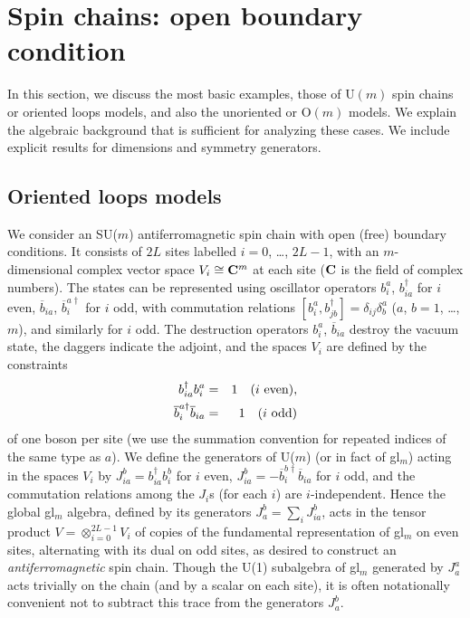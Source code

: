 \documentclass[twocolumn,floats,pra]{revtex4}
\begin{document}

\section{Spin chains: open boundary condition}
\label{chains}

In this section, we discuss the most basic examples, those of
U$(m)$ spin chains or oriented loops models, and also the
unoriented or O$(m)$ models. We explain the algebraic background
that is sufficient for analyzing these cases. We include explicit
results for dimensions and symmetry generators.


\subsection{Oriented loops models}

We consider an SU($m$) antiferromagnetic spin chain with open
(free) boundary conditions. It consists of $2L$ sites labelled
$i=0$, \ldots, $2L-1$, with an $m$-dimensional complex vector
space $V_i\cong {\bf C}^m$ at each site ($\bf C$ is the field of
complex numbers). The states can be represented using oscillator
operators $b_i^a$, $b_{ia}^\dagger$ for $i$ even,
$\overline{b}_{ia}$, $\overline{b}_i^{a\dagger}$ for $i$ odd, with
commutation relations $[b_i^a,b_{jb}^\dagger]=
\delta_{ij}\delta_b^a$ ($a$, $b=1$, \ldots, $m$), and similarly
for $i$ odd. The destruction operators $b_i^a$,
$\overline{b}_{ia}$ destroy the vacuum state, the daggers indicate
the adjoint, and the spaces $V_i$ are defined by the constraints
\begin{eqnarray}
b_{ia}^\dagger b_i^a&=& 1 \quad (i\hbox{ even}),\label{constr1}\\
\overline{b}_i^{a\dagger} \overline{b}_{ia} &=& 1 \quad (i\hbox{
odd})\label{constr2}
\end{eqnarray}
of one boson per site (we use the summation convention for
repeated indices of the same type as $a$). We define the
generators of U($m$) (or in fact of gl$_m$) acting in the spaces
$V_i$ by $J_{ia}^b=b_{ia}^\dagger b_i^b$ for $i$ even,
$J_{ia}^b=-\overline{b}_i^{b\dagger} \overline{b}_{ia}$ for $i$
odd, and the commutation relations among the $J_i$s (for each $i$)
are $i$-independent. Hence the global gl$_m$ algebra, defined by
its generators $J_a^b=\sum_i J_{ia}^b$, acts in the tensor product
$V=\otimes_{i=0}^{2L-1} V_i$ of copies of the fundamental
representation of gl$_m$ on even sites, alternating with its dual
on odd sites, as desired to construct an {\em antiferromagnetic}
spin chain. Though the U(1) subalgebra of gl$_m$ generated by
$J_a^a$ acts trivially on the chain (and by a scalar on each
site), it is often notationally convenient not to subtract this
trace from the generators $J_a^b$.
\end{document}
